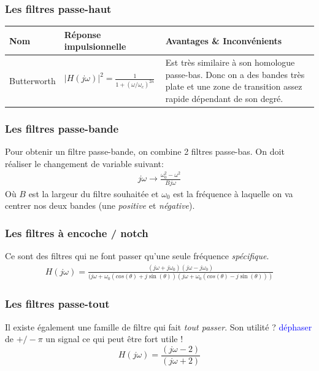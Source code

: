 \documentclass{report}
\begin{document}
\subsubsection{Les filtres passe-haut}
\begin{center}
\begin{tabular}{|m{3cm}|m{5cm}|m{7cm}|}
\hline
\cellcolor[gray]{0.8} Nom &\cellcolor[gray]{0.8} Réponse impulsionnelle & \cellcolor[gray]{0.8} Avantages \& Inconvénients\\
\hline
Butterworth & $|H(j\omega)|^2 = \frac{1}{1+(\omega/\omega_c)^{2n}}$ & Est très similaire à son homologue passe-bas. Donc on a des bandes très plate et une zone de transition assez rapide dépendant de son degré.\\
\hline

\end{tabular}
\end{center}

\subsubsection{Les filtres passe-bande}
Pour obtenir un filtre passe-bande, on combine 2 filtres passe-bas. On doit réaliser le changement de variable suivant:
\begin{align*}
j\omega \rightarrow \frac{\omega_0^2 - \omega^2}{Bj\omega}
\end{align*}
Où $B$ est la largeur du filtre souhaitée et $\omega_0$ est la fréquence à laquelle on va centrer nos deux bandes (une \textit{positive} et \textit{négative}).

\subsubsection{Les filtres à encoche / notch}
Ce sont des filtres qui ne font passer qu'une seule fréquence \textit{spécifique}.
\begin{align}
H(j\omega) = \frac{(j\omega + j\omega_0)(j\omega - j\omega_0)}{(j \omega + \omega_0(cos(\theta) + j\sin(\theta))(j \omega + \omega_0(cos(\theta) -j\sin(\theta))) }
\end{align}

\subsubsection{Les filtres passe-tout}
Il existe également une famille de filtre qui fait \textit{tout passer}. Son utilité ? \textcolor{blue}{déphaser} de $+/- \pi$ un signal ce qui peut être fort utile !
\begin{equation}
H(j\omega) = \frac{(j\omega - 2)}{(j\omega + 2)}
\end{equation}
\end{document}
